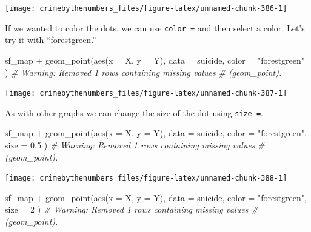 \documentclass[
  a4paper,
]{krantz}
\makeatletter
\newenvironment{Shaded}{\begin{snugshade}}{\end{snugshade}}
\newcommand{\AttributeTok}[1]{\textcolor[rgb]{0.61,0.61,0.61}{#1}}
\newcommand{\CommentTok}[1]{\textcolor[rgb]{0.37,0.37,0.37}{\textit{#1}}}
\newcommand{\DecValTok}[1]{\textcolor[rgb]{0.06,0.06,0.06}{#1}}
\newcommand{\FloatTok}[1]{\textcolor[rgb]{0.06,0.06,0.06}{#1}}
\newcommand{\FunctionTok}[1]{\textcolor[rgb]{0,0,0}{#1}}
\newcommand{\NormalTok}[1]{#1}
\newcommand{\SpecialCharTok}[1]{\textcolor[rgb]{0,0,0}{#1}}
\newcommand{\StringTok}[1]{\textcolor[rgb]{0.5,0.5,0.5}{#1}}
\newenvironment{kframe}{%
\medskip{}
\setlength{\fboxsep}{.8em}
 \def\at@end@of@kframe{}%
 \ifinner\ifhmode%
  \def\at@end@of@kframe{\end{minipage}}%
  \begin{minipage}{\columnwidth}%
 \fi\fi%
 \def\FrameCommand##1{\hskip\@totalleftmargin \hskip-\fboxsep
 \colorbox{shadecolor}{##1}\hskip-\fboxsep
     \hskip-\linewidth \hskip-\@totalleftmargin \hskip\columnwidth}%
 \MakeFramed {\advance\hsize-\width
   \@totalleftmargin\z@ \linewidth\hsize
   \@setminipage}}%
 {\par\unskip\endMakeFramed%
 \at@end@of@kframe}
\renewenvironment{Shaded}{\begin{kframe}}{\end{kframe}}
\makeatother
\begin{document}
\begin{center}\texttt{[image: crimebythenumbers\_files/figure-latex/unnamed-chunk-386-1]} \end{center}

If we wanted to color the dots, we can use \texttt{color\ =}
and then select a color. Let's try it with ``forestgreen.''

\begin{Shaded}
\begin{Highlighting}[]
\NormalTok{sf\_map }\SpecialCharTok{+}
  \FunctionTok{geom\_point}\NormalTok{(}\FunctionTok{aes}\NormalTok{(}\AttributeTok{x =}\NormalTok{ X, }\AttributeTok{y =}\NormalTok{ Y),}
    \AttributeTok{data  =}\NormalTok{ suicide,}
    \AttributeTok{color =} \StringTok{"forestgreen"}
\NormalTok{  )}
\CommentTok{\# Warning: Removed 1 rows containing missing values}
\CommentTok{\# (geom\_point).}
\end{Highlighting}
\end{Shaded}

\begin{center}\texttt{[image: crimebythenumbers\_files/figure-latex/unnamed-chunk-387-1]} \end{center}

As with other graphs we can change the size of the dot using
\texttt{size\ =}.

\begin{Shaded}
\begin{Highlighting}[]
\NormalTok{sf\_map }\SpecialCharTok{+}
  \FunctionTok{geom\_point}\NormalTok{(}\FunctionTok{aes}\NormalTok{(}\AttributeTok{x =}\NormalTok{ X, }\AttributeTok{y =}\NormalTok{ Y),}
    \AttributeTok{data  =}\NormalTok{ suicide,}
    \AttributeTok{color =} \StringTok{"forestgreen"}\NormalTok{,}
    \AttributeTok{size  =} \FloatTok{0.5}
\NormalTok{  )}
\CommentTok{\# Warning: Removed 1 rows containing missing values}
\CommentTok{\# (geom\_point).}
\end{Highlighting}
\end{Shaded}

\begin{center}\texttt{[image: crimebythenumbers\_files/figure-latex/unnamed-chunk-388-1]} \end{center}

\begin{Shaded}
\begin{Highlighting}[]
\NormalTok{sf\_map }\SpecialCharTok{+}
  \FunctionTok{geom\_point}\NormalTok{(}\FunctionTok{aes}\NormalTok{(}\AttributeTok{x =}\NormalTok{ X, }\AttributeTok{y =}\NormalTok{ Y),}
    \AttributeTok{data  =}\NormalTok{ suicide,}
    \AttributeTok{color =} \StringTok{"forestgreen"}\NormalTok{,}
    \AttributeTok{size  =} \DecValTok{2}
\NormalTok{  )}
\CommentTok{\# Warning: Removed 1 rows containing missing values}
\CommentTok{\# (geom\_point).}
\end{Highlighting}
\end{Shaded}
\end{document}
